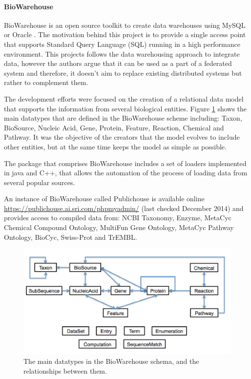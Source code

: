\paragraph{BioWarehouse}
BioWarehouse is an open source toolkit to create data warehouses using MySQL or Oracle \cite{LEE2006}. The motivation behind this project is to provide  a single access point that supports Standard Query Language (SQL) running in a high performance environment.
This projects follows the data warehousing approach to integrate data, however the authors argue that it can be used as a part of a federated system and therefore, it doesn't aim to replace existing distributed systems but rather to complement them.

The development efforts were focused on the creation of a relational data model that supports the information from several biological entities. Figure \ref{fig:biowarehouse} shows the main datatypes that are defined in the BioWarehouse scheme including: Taxon, BioSource, Nucleic Acid, Gene, Protein, Feature, Reaction, Chemical and Pathway. It was the objective of the creators that the model evolves to include other entities, but at the same time keeps the model as simple as possible.

The package that comprises BioWarehouse includes a set of loaders implemented in java and C++, that allows the automation of the process of loading data from several popular sources. 

An instance of BioWarehouse called Publichouse is available online \url{https://publichouse.ai.sri.com/phpmyadmin/} (last checked December 2014) and provides access to compiled data from: NCBI Taxonomy, Enzyme, MetaCyc Chemical Compound Ontology, MultiFun Gene Ontology, MetaCyc Pathway Ontology, BioCyc, Swiss-Prot and TrEMBL.

\begin{figure}  
\centering
\includegraphics[width=\textwidth]{figures/biowarehouse.png}
\caption[Original BioWarehouse schema.]{The main datatypes in the BioWarehouse schema, and the relationships between them.
\label{fig:biowarehouse}}
\end{figure}

